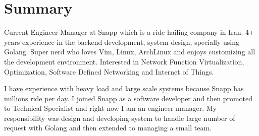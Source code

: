 \section{Summary}\closesection{}

Current Engineer Manager at Snapp which is a ride hailing company in Iran. 4+ years experience in the backend development, system design,
specially using Golang.
Super nerd who loves Vim, Linux, ArchLinux and enjoys customizing all the development environment.
Interested in Network Function Virtualization, Optimization, Software Defined Networking and Internet of Things.

I have experience with heavy load and large scale systems because Snapp has millions ride per day.
I joined Snapp as a software developer and then promoted to Technical Specialist and right now I am an engineer manager.
My responsibility was design and developing system to handle large number of request with Golang and then extended to managing a small team.
